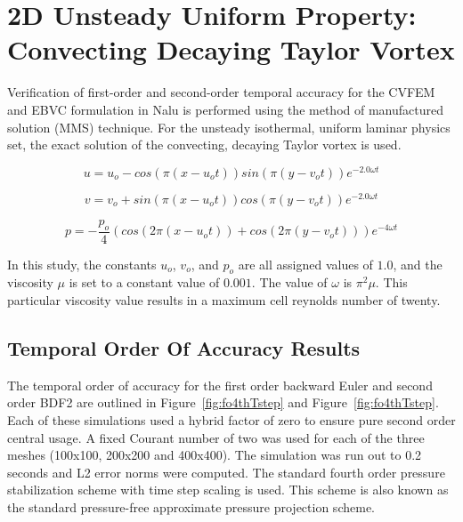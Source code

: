 \section{2D Unsteady Uniform Property: Convecting Decaying Taylor Vortex}

Verification of first-order and second-order temporal accuracy for the
CVFEM and EBVC formulation in Nalu is performed using the method of manufactured 
solution (MMS) technique. For the unsteady isothermal, uniform laminar physics set,
the exact solution of the convecting, decaying Taylor vortex is used.

\begin{equation}
  u = u_o - cos(\pi(x-u_ot)) sin(\pi(y-v_ot))e^{-2.0\omega t}
\label{advConvTV_u}
\end{equation}

\begin{equation}
  v = v_o + sin(\pi(x-u_ot)) cos(\pi(y-v_ot))e^{-2.0\omega t} 
\label{advConvTV_v}
\end{equation}

\begin{equation}
  p = -\frac{p_o}{4}(cos(2\pi(x-u_ot)) + cos(2\pi(y-v_ot)))e^{-4\omega t}
\label{advConvTV_p}
\end{equation}

In this study, the constants $u_o$, $v_o$, and $p_o$ are all assigned values of $1.0$,
and the viscosity $\mu$ is set to a
constant value of $0.001$. The value of $\omega$ is $\pi^2\mu$. This particular viscosity value 
results in a maximum cell reynolds number of twenty.  

\subsection{Temporal Order Of Accuracy Results}
The temporal order of accuracy for the first order backward Euler and second order BDF2
are outlined in Figure~\ref{fig:fo4thTstep} and Figure~\ref{fig:fo4thTstep}. Each of these
simulations used a hybrid factor of zero to ensure pure second order central usage. A
fixed Courant number of two was used for each of the three meshes (100x100, 200x200 and 400x400).
The simulation was run out to 0.2 seconds and L2 error norms were computed. The standard
fourth order pressure stabilization scheme with time step scaling is used. This scheme is also
known as the standard pressure-free approximate pressure projection scheme.


